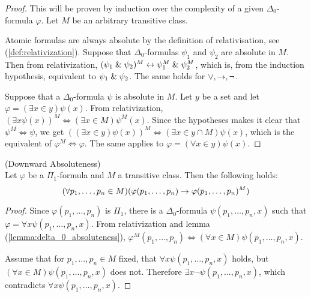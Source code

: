 \begin{proof}
This will be proven by induction over the complexity of a given $\Delta_0$-formula $\varphi$. Let $M$ be an arbitrary transitive class. 

Atomic formulas are always absolute by the definition of relativisation, see (\ref{def:relativization}).
Suppose that $\Delta_0$-formulas $\psi_1$ and $\psi_2$ are absolute in $M$. Then from relativization, $(\psi_1 \mathrel{\&} \psi_2)^M \leftrightarrow \psi_1^M \mathrel{\&} \psi_2^M$, which is, from the induction hypothesis, equivalent to $\psi_1 \mathrel{\&} \psi_2$. The same holds for $\lor, \rightarrow, \neg$.

Suppose that a $\Delta_0$-formula $\psi$ is absolute in $M$. Let $y$ be a set and let $\varphi = (\exists x \in y) \psi(x)$. 
From relativization, $(\exists x \psi(x))^M \iff (\exists x \in M) \psi^M(x)$. Since the hypotheses makes it clear that $\psi^M \iff \psi$, we get $((\exists x \in y) \psi(x))^M \iff (\exists x \in y\cap M) \psi(x)$, which is the equivalent of $\varphi^M \iff \varphi$. The same applies to $\varphi = (\forall x \in y) \psi(x)$.
\end{proof}

\begin{lemma}{(Downward Absoluteness)}\label{lemma:downward_absoluteness}\\
Let $\varphi$ be a $\Pi_1$-formula and $M$ a transitive class. Then the following holds:
\begin{equation}
(\forall p_1, \ldots, p_n \in M)(\varphi(p_1, \ldots, p_n) \rightarrow \varphi(p_1, \ldots, p_n)^M)
\end{equation}
\end{lemma}
\begin{proof}
Since $\varphi(p_1, \ldots, p_n)$ is $\Pi_1$, there is a $\Delta_0$-formula $\psi(p_1, \ldots, p_n, x)$ such that $\varphi = \forall x \psi(p_1, \ldots, p_n, x)$. 
From relativization and lemma (\ref{lemma:delta_0_absoluteness}), $\varphi^M(p_1, \ldots, p_n) \iff (\forall x \in M)\psi(p_1, \ldots, p_n, x)$.

Assume that for $p_1, \ldots, p_n \in M$ fixed, that $\forall x \psi(p_1, \ldots, p_n, x)$ holds, but $(\forall x \in M)\psi(p_1, \ldots, p_n, x)$ does not. 
Therefore $\exists x \neg \psi(p_1, \ldots, p_n, x)$, which contradicts $\forall x \psi(p_1, \ldots, p_n, x)$.
\end{proof}


